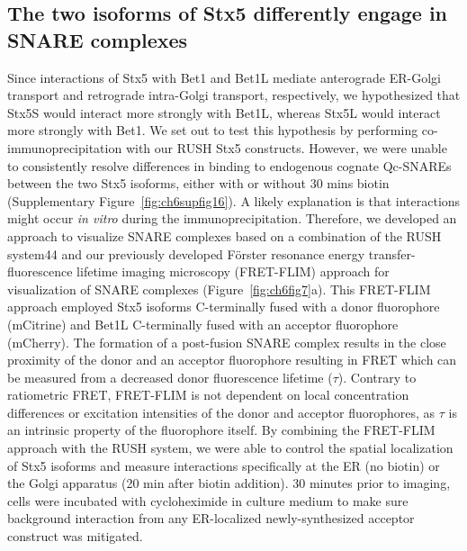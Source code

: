 \subsection{The two isoforms of Stx5 differently engage in SNARE complexes}

Since interactions of Stx5 with Bet1 and Bet1L mediate anterograde ER-Golgi transport and retrograde intra-Golgi transport, respectively\cite{banfield_snare-like_1995,parlati_topological_2000,parlati_distinct_2002,xu_gs15_2002}, we hypothesized that Stx5S would interact more strongly with Bet1L, whereas Stx5L would interact more strongly with Bet1. We set out to test this hypothesis by performing co-immunoprecipitation with our RUSH Stx5 constructs. However, we were unable to consistently resolve differences in binding to endogenous cognate Qc-SNAREs between the two Stx5 isoforms, either with or without 30 mins biotin (Supplementary Figure~\ref{fig:ch6supfig16}). A likely explanation is that interactions might occur \emph{in vitro} during the immunoprecipitation. Therefore, we developed an approach to visualize SNARE complexes based on a combination of the RUSH system\cite{boncompain_synchronization_2012}44 and our previously developed Förster resonance energy transfer-fluorescence lifetime imaging microscopy (FRET-FLIM) approach for visualization of SNARE complexes\cite{verboogen_fluorescence_2017} (Figure~\ref{fig:ch6fig7}a). This FRET-FLIM approach employed Stx5 isoforms C-terminally fused with a donor fluorophore (mCitrine) and Bet1L C-terminally fused with an acceptor fluorophore (mCherry). The formation of a post-fusion SNARE complex results in the close proximity of the donor and an acceptor fluorophore resulting in FRET which can be measured from a decreased donor fluorescence lifetime ($\tau$). Contrary to ratiometric FRET, FRET-FLIM is not dependent on local concentration differences or excitation intensities of the donor and acceptor fluorophores, as $\tau$ is an intrinsic property of the fluorophore itself. By combining the FRET-FLIM approach with the RUSH system, we were able to control the spatial localization of Stx5 isoforms and measure interactions specifically at the ER (no biotin) or the Golgi apparatus (20 min after biotin addition). 30 minutes prior to imaging, cells were incubated with cycloheximide in culture medium to make sure background interaction from any ER-localized newly-synthesized acceptor construct was mitigated.

